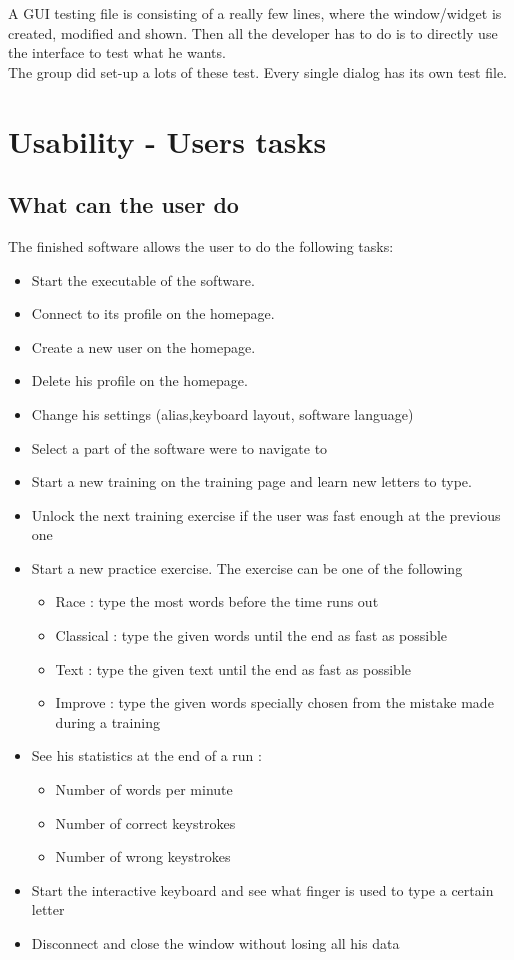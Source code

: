 A GUI testing file is consisting of a really few lines, where the window/widget is created, modified and shown. Then all the developer has to do is to directly use the interface to test what he wants.\\
The group did set-up a lots of these test. Every single dialog has its own test file.


\part{Usability - Users tasks}
\chapter{What can the user do}
The finished software allows the user to do the following tasks:
\begin{itemize}
	\item Start the executable of the software.
	\item Connect to its profile on the homepage.
	\item Create a new user on the homepage.
	\item Delete his profile on the homepage.
	\item Change his settings (alias,keyboard layout, software language)
	\item Select a part of the software were to navigate to
	\item Start a new training on the training page and learn new letters to type.
	\item Unlock the next training exercise if the user was fast enough at the previous one
	\item Start a new practice exercise. The exercise can be one of the following 
	\begin{itemize}
		\item Race : type the most words before the time runs out
		\item Classical : type the given words until the end as fast as possible
		\item Text : type the given text until the end as fast as possible
		\item Improve : type the given words specially chosen from the mistake made during a training
	\end{itemize}
	\item See his statistics at the end of a run :
	\begin{itemize}
		\item Number of words per minute
		\item Number of correct keystrokes
		\item Number of wrong keystrokes
	\end{itemize}
	\item Start the interactive keyboard and see what finger is used to type a certain letter
	\item Disconnect and close the window without losing all his data
\end{itemize}


